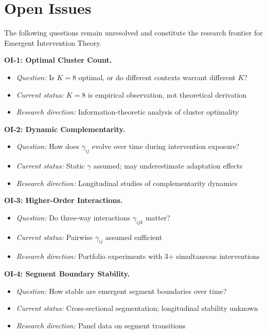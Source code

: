 \section{Open Issues}
\label{sec:ie-open-issues}

\begin{tcolorbox}[colback=yellow!5!white, colframe=yellow!75!black,
    title=\textbf{Open Issues: Research Agenda for EIT}]

The following questions remain unresolved and constitute the research frontier for Emergent Intervention Theory.

\textbf{OI-1: Optimal Cluster Count.}
\begin{itemize}[nosep]
    \item \textit{Question:} Is $K = 8$ optimal, or do different contexts warrant different $K$?
    \item \textit{Current status:} $K = 8$ is empirical observation, not theoretical derivation
    \item \textit{Research direction:} Information-theoretic analysis of cluster optimality
\end{itemize}

\textbf{OI-2: Dynamic Complementarity.}
\begin{itemize}[nosep]
    \item \textit{Question:} How does $\gamma_{ij}$ evolve over time during intervention exposure?
    \item \textit{Current status:} Static $\gamma$ assumed; may underestimate adaptation effects
    \item \textit{Research direction:} Longitudinal studies of complementarity dynamics
\end{itemize}

\textbf{OI-3: Higher-Order Interactions.}
\begin{itemize}[nosep]
    \item \textit{Question:} Do three-way interactions $\gamma_{ijk}$ matter?
    \item \textit{Current status:} Pairwise $\gamma_{ij}$ assumed sufficient
    \item \textit{Research direction:} Portfolio experiments with 3+ simultaneous interventions
\end{itemize}

\textbf{OI-4: Segment Boundary Stability.}
\begin{itemize}[nosep]
    \item \textit{Question:} How stable are emergent segment boundaries over time?
    \item \textit{Current status:} Cross-sectional segmentation; longitudinal stability unknown
    \item \textit{Research direction:} Panel data on segment transitions
\end{itemize}


\end{tcolorbox}
